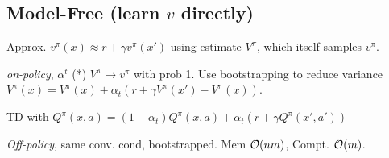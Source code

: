 
\subsection{Model-Free (learn \(v\) directly)}

\begin{definition}[Bootstrapping]
    Approx. \(v^\pi(x) \approx r + \gamma v^\pi(x')\) using estimate \(V^\pi\), which itself samples \(v^\pi\).
\end{definition}

\begin{definition}[TD-learning]
    \textit{on-policy}, \(\alpha^t\) (*) \(V^\pi \to v^\pi\) with prob 1.
    Use bootstrapping to reduce variance
    \(V^\pi(x) = V^\pi(x) + \alpha_t(r + \gamma V^\pi(x') - V^\pi(x))\).
\end{definition}

\begin{definition}[SARSA]
    TD with \(Q^\pi(x, a) = (1 - \alpha_t) Q^\pi(x, a) + \alpha_t(r + \gamma Q^\pi(x', a'))\)
\end{definition}

\begin{definition}[Q-learning]
    \textit{Off-policy}, same conv. cond, bootstrapped. Mem \(\mathcal{O}(nm)\), Compt. \(\mathcal{O}(m)\).\\
\end{definition}
